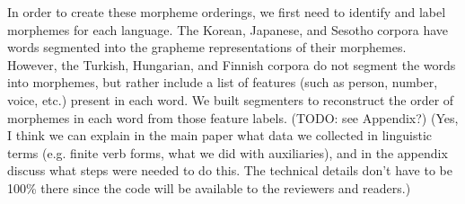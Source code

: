 \documentclass[11pt,letterpaper]{article}
\newcommand\mhahn[1]{{\color{red}(#1)}}
\newcommand\becky[1]{{\color{blue}(#1)}}
\begin{document}
In order to create these morpheme orderings, we first need to identify and label morphemes for each language. The Korean, Japanese, and Sesotho corpora have words segmented into the grapheme representations of their morphemes. However, the Turkish, Hungarian, and Finnish corpora do not segment the words into morphemes, but rather include a list of features (such as person, number, voice, etc.) present in each word. We built segmenters to reconstruct the order of morphemes in each word from those feature labels.
\becky{TODO: see Appendix?} \mhahn{Yes, I think we can explain in the main paper what data we collected in linguistic terms (e.g. finite verb forms, what we did with auxiliaries), and in the appendix discuss what steps were needed to do this. The technical details don't have to be 100\% there since the code will be available to the reviewers and readers.}
\end{document}
